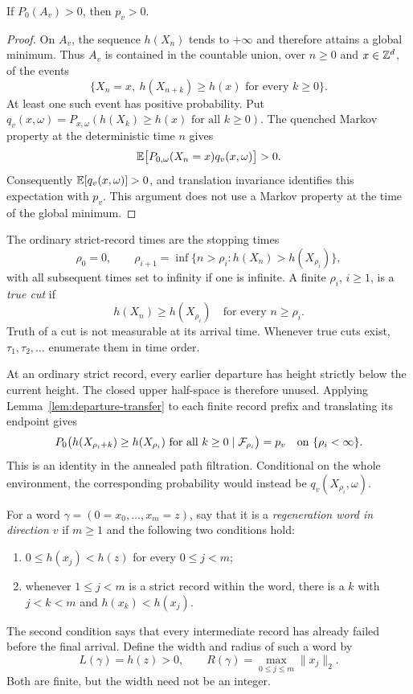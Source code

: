 \begin{lemma}\label{lem:positive-nonbacktracking}
If $P_0(A_v)>0$, then $p_v>0$.
\end{lemma}

\begin{proof}
On $A_v$, the sequence $h(X_n)$ tends to $+\infty$ and therefore attains a
global minimum.  Thus $A_v$ is contained in the countable union, over
$n\ge0$ and $x\in\mathbb Z^d$, of the events
\[
 \{X_n=x,\ h(X_{n+k})\ge h(x)\text{ for every }k\ge0\}.
\]
At least one such event has positive probability.  Put
$q_v(x,\omega)=P_{x,\omega}(h(X_k)\ge h(x)\text{ for all }k\ge0)$.
The quenched Markov property at the deterministic time $n$ gives
\[
 \mathbb E\big[P_{0,\omega}(X_n=x)q_v(x,\omega)\big]>0.
\]
Consequently $\mathbb E[q_v(x,\omega)]>0$, and translation invariance identifies
this expectation with $p_v$.  This argument does not use a Markov property
at the time of the global minimum.
\end{proof}

The ordinary strict-record times are the stopping times
\[
 \rho_0=0,\qquad
 \rho_{i+1}=\inf\{n>\rho_i:h(X_n)>h(X_{\rho_i})\},
\]
with all subsequent times set to infinity if one is infinite.  A finite
$\rho_i$, $i\ge1$, is a \emph{true cut} if
\[
 h(X_n)\ge h(X_{\rho_i})\quad\text{for every }n\ge\rho_i.
\]
Truth of a cut is not measurable at its arrival time.
Whenever true cuts exist, $\tau_1,\tau_2,\ldots$ enumerate them in time
order.

At an ordinary strict record, every earlier departure has height strictly
below the current height.  The closed upper half-space is therefore
unused.  Applying Lemma~\ref{lem:departure-transfer} to each finite record
prefix and translating its endpoint gives
\begin{equation}\label{eq:fresh-record}
 P_0\big(h(X_{\rho_i+k})\ge h(X_{\rho_i})\text{ for all }k\ge0
          \mid\mathcal F_{\rho_i}\big)=p_v
       \quad\text{on }\{\rho_i<\infty\}.
\end{equation}
This is an identity in the annealed path filtration.  Conditional on the
whole environment, the corresponding probability would instead be
$q_v(X_{\rho_i},\omega)$.

For a word $\gamma=(0=x_0,\ldots,x_m=z)$, say that it is a
\emph{regeneration word in direction $v$} if $m\ge1$ and the following two
conditions hold:
\begin{enumerate}
 \item $0\le h(x_j)<h(z)$ for every $0\le j<m$;
 \item whenever $1\le j<m$ is a strict record within the word, there is a
       $k$ with $j<k<m$ and $h(x_k)<h(x_j)$.
\end{enumerate}
The second condition says that every intermediate record has already
failed before the final arrival.  Define the width and radius of such a
word by
\[
 L(\gamma)=h(z)>0,\qquad
 R(\gamma)=\max_{0\le j\le m}\|x_j\|_2.
\]
Both are finite, but the width need not be an integer.

